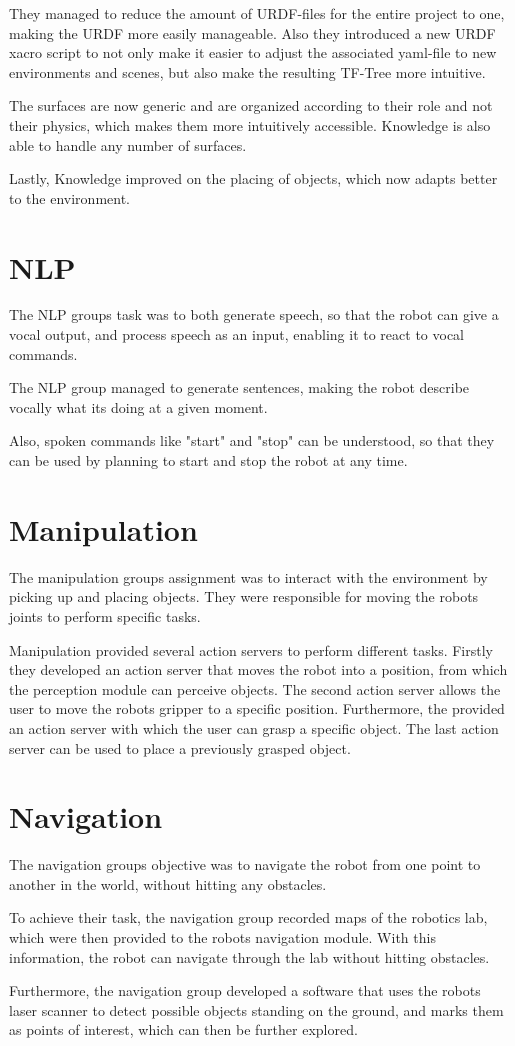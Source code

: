 \documentclass[main.tex]{subfiles}
\begin{document}
		They managed to reduce the amount of URDF-files for the entire project to one, making the URDF more easily manageable.  Also they introduced a new URDF xacro script to not only make it easier to adjust the associated yaml-file to new environments and scenes, but also make the resulting TF-Tree more intuitive.
		
		The surfaces are now generic and are organized according to their role and not their physics, which makes them more intuitively accessible. Knowledge is also able to handle any number of surfaces.
		
		Lastly, Knowledge improved on the placing of objects, which now adapts better to the environment.
		 		
		\section{NLP}
		The NLP groups task was to both generate speech, so that the robot can give a vocal output, and process speech as an input, enabling it to react to vocal commands.
		
		The NLP group managed to generate sentences, making the robot describe vocally what its doing at a given moment.
		
		Also, spoken commands like "start" and "stop" can be understood, so that they can be used by planning to start and stop the robot at any time.
		
		\section{Manipulation}
		The manipulation groups assignment was to interact with the environment by picking up and placing objects. They were responsible for moving the robots joints to perform specific tasks.
		
		Manipulation provided several action servers to perform different tasks. Firstly they developed an action server that moves the robot into a position, from which the perception module can perceive objects. The second action server allows the user to move the robots gripper to a specific position. Furthermore, the provided an action server with which the user can grasp a specific object. The last action server can be used to place a previously grasped object.
		
		\section{Navigation}	  	
		The navigation groups objective was to navigate the robot from one point to another in the world, without hitting any obstacles.
		
		To achieve their task, the navigation group recorded maps of the robotics lab, which were then provided to the robots navigation module. With this information, the robot can navigate through the lab without hitting obstacles.
		
		Furthermore, the navigation group developed a software that uses the robots laser scanner to detect possible objects standing on the ground, and marks them as points of interest, which can then be further explored.

		
	\endgroup
\end{document}
